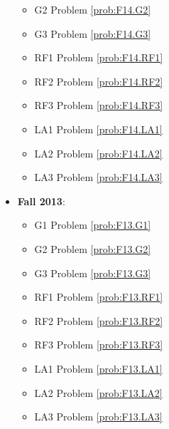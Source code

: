 \documentclass{article}
\theoremstyle{definition}
\begin{document}
\begin{itemize}
\begin{itemize}
	\item G2 Problem \ref{prob:F14.G2} 
	\item G3 Problem \ref{prob:F14.G3}
	\item RF1 Problem \ref{prob:F14.RF1}
	\item RF2 Problem \ref{prob:F14.RF2}
	\item RF3 Problem \ref{prob:F14.RF3}
	\item LA1 Problem \ref{prob:F14.LA1}
	\item LA2 Problem \ref{prob:F14.LA2}
	\item LA3 Problem \ref{prob:F14.LA3}
	\end{itemize}
	\item \textbf{Fall 2013}:  
	\begin{itemize}
	\item G1 Problem \ref{prob:F13.G1} 
	\item G2 Problem \ref{prob:F13.G2} 
	\item G3 Problem \ref{prob:F13.G3}
	\item RF1 Problem \ref{prob:F13.RF1}
	\item RF2 Problem \ref{prob:F13.RF2}
	\item RF3 Problem \ref{prob:F13.RF3}
	\item LA1 Problem \ref{prob:F13.LA1}
	\item LA2 Problem \ref{prob:F13.LA2}
	\item LA3 Problem \ref{prob:F13.LA3}
	\end{itemize}


\end{itemize}
\end{document}

